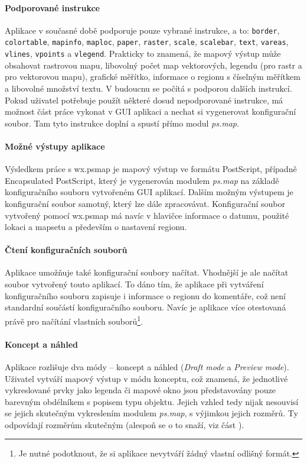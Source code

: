 \documentclass[a4paper,12pt,draft]{article}
\newcommand{\modul}[1]{\emph{#1}}
\newcommand{\instr}[1]{\lstinline[style=psmapInline]|#1|}
\begin{document}
\paragraph*{Podporované instrukce}
    Aplikace v současné době podporuje pouze vybrané instrukce, a to: \instr{border}, \instr{colortable}, \instr{mapinfo}, \instr{maploc}, \instr{paper}, \instr{raster}, \instr{scale}, \instr{scalebar}, \instr{text}, \instr{vareas}, \instr{vlines}, \instr{vpoints} a \instr{vlegend}. Prakticky to znamená, že mapový výstup může obsahovat rastrovou mapu, libovolný počet map vektorových, legendu (pro rastr a pro vektorovou mapu), grafické měřítko, informace o regionu s číselným měřítkem a libovolné množství textu. V budoucnu se počítá s podporou dalších instrukcí. Pokud uživatel potřebuje použít některé dosud nepodporované instrukce, má možnost část práce vykonat v GUI aplikaci a nechat si vygenerovat konfigurační soubor. Tam tyto instrukce doplní a spustí přímo modul \modul{ps.map}.
    
\paragraph*{Možné výstupy aplikace}
Výsledkem práce s wx.psmap je mapový výstup ve formátu PostScript, případně Encapsulated PostScript, který je vygenerován modulem \modul{ps.map} na základě konfiguračního souboru vytvořeném GUI aplikací. Dalším možným výstupem je konfigurační soubor samotný, který lze dále zpracovávat. Konfigurační soubor vytvořený pomocí wx.psmap má navíc v hlavičce informace o datumu, použité lokaci a mapsetu a především o nastavení regionu.

\paragraph*{Čtení konfiguračních souborů}
Aplikace umožňuje také konfigurační soubory načítat. Vhodnější je ale načítat soubor vytvořený touto aplikací. To dáno tím, že aplikace při vytváření konfiguračního souboru zapisuje i informace o regionu do komentáře, což není standardní součástí konfiguračního souboru. Navíc je aplikace více otestovaná právě pro načítání vlastních souborů\footnote{Je nutné podotknout, že si aplikace nevytváří žádný vlastní odlišný formát.}. 

\paragraph*{Koncept a náhled}
Aplikace rozlišuje dva módy -- koncept a náhled (\emph{Draft mode} a \emph{Preview mode}). 
Uživatel vytváří mapový výstup v módu konceptu, což znamená, že jednotlivé vykreslované prvky jako legenda či mapové okno jsou představovány pouze barevným obdélníkem s popisem typu objektu. Jejich vzhled tedy nijak nesouvisí se jejich skutečným vykreslením modulem \modul{ps.map}, s výjimkou jejich rozměrů. Ty odpovídají rozměrům skutečným (alespoň se o to snaží, viz část ). 
\end{document}
